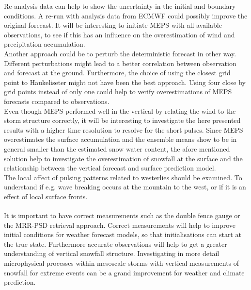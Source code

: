 Re-analysis data can help to show the uncertainty in the initial and boundary conditions. A re-run with analysis data from ECMWF could possibly improve the original forecast. It will be interesting to initiate MEPS with all available observations, to see if this has an influence on the overestimation of wind and precipitation accumulation.
\\
Another approach could be to perturb the deterministic forecast in other way. Different perturbations might lead to a better correlation between observation and forecast at the ground. Furthermore, the choice of using the closest grid point to Haukeliseter might not have been the best approach. Using four close by grid points instead of only one could help to verify overestimations of MEPS forecasts compared to observations. 
\\
Even though MEPS performed well in the vertical by relating the wind to the storm structure correctly, it will be interesting to investigate the here presented results with a higher time resolution to resolve for the short pulses. Since MEPS overestimates the surface accumulation and the ensemble means show to be in general smaller than the estimated snow water content, the afore mentioned solution help to investigate the overestimation of snowfall at the surface and the relationship between the vertical forecast and surface prediction model.
\\
The local affect of pulsing patterns related to westerlies should be examined. To understand if e.g. wave breaking occurs at the mountain to the west, or if it is an effect of local surface fronts. 
\\
\\
It is important to have correct measurements such as the double fence gauge or the MRR-PSD retrieval approach. Correct measurements will help to improve initial conditions for weather forecast models, so that initialisations can start at the true state. Furthermore accurate observations will help to get a greater understanding of vertical snowfall structure.
Investigating in more detail microphysical processes within mesoscale storms with vertical measurements of snowfall for extreme events can be a grand improvement for weather and climate prediction. 

